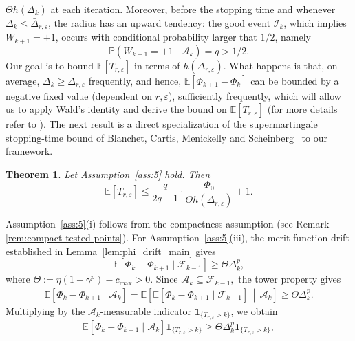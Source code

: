 \documentclass[11pt,a4paper]{article}
\newtheorem{theorem}{Theorem}[section]
\newcommand{\me}{\mathbb{E}}
\newcommand{\D}{\Delta}
\newcommand{\Dexp}{p}
\newcommand{\goldelta}{r}
\begin{document}
\(\Theta h(\Delta_k)\) at each iteration. Moreover, before the stopping time
and whenever \(\Delta_k\le \bar\Delta_{\goldelta,\varepsilon}\), the radius
has an upward tendency: the good event \(\mathcal I_k\), which implies
\(W_{k+1}=+1\), occurs with conditional probability larger that  \(1/2\), namely
\[\mathbb P(W_{k+1}=+1\mid\mathcal A_k)
   = q >1/2.
\]
Our goal is to bound \(\mathbb E[T_{\goldelta,\varepsilon}]\) in terms of
\(h(\bar\Delta_{\goldelta,\varepsilon})\). What happens is that, on average, $\D_k \geq \bar \D_{\goldelta,\varepsilon}$ frequently, and hence, $\me[\Phi_{k+1} - \Phi_k]$ can be bounded by a negative fixed value (dependent on $\goldelta, \varepsilon$), sufficiently frequently, which will allow us
to apply Wald’s identity and derive the bound on $\me[T_{\goldelta,\varepsilon}]$ (for more details refer to \cite[Theorem 2]{MR4151319}). 
The next result is a direct specialization of the supermartingale stopping-time bound of Blanchet, Cartis, Menickelly and Scheinberg~\cite[Theorem~2]{MR4151319} to our framework.
\begin{theorem}\label{t:expected complexity}
    Let Assumption~\ref{ass:5} hold. Then
    \[
        \mathbb E[T_{\goldelta,\varepsilon}]
        \le
        \frac{q}{2q-1}
        \cdot
        \frac{\Phi_0}{\Theta h(\bar\Delta_{\goldelta,\varepsilon})}
        +1 .
    \]
\end{theorem}
Assumption~\ref{ass:5}(i) follows from the compactness assumption (see Remark \ref{rem:compact-tested-points}). For Assumption~\ref{ass:5}(iii), the merit-function drift established in Lemma~\ref{lem:phi_drift_main} gives
\[
    \mathbb E[
        \Phi_k-\Phi_{k+1}
        \mid
        \mathcal F_{k-1}
    ]
    \ge
    \Theta\Delta_k^{\Dexp},
\]
where
    $\Theta:=\eta(1-\gamma^{\Dexp})-c_{\max}>0.$
Since
\(
    \mathcal A_k\subseteq\mathcal F_{k-1},
\)
the tower property gives
\[
\begin{aligned}
    \mathbb E[
        \Phi_k-\Phi_{k+1}
        \mid
        \mathcal A_k
    ]
    =
    \mathbb E\!\left[
        \mathbb E[
            \Phi_k-\Phi_{k+1}
            \mid
            \mathcal F_{k-1}
        ]
        \,\middle|\,
        \mathcal A_k
    \right]                                                   
    \ge
    \Theta\Delta_k^{\Dexp}.
\end{aligned}
\]
Multiplying by the \(\mathcal A_k\)-measurable indicator
\(\mathbf 1_{\{T_{\goldelta,\varepsilon}>k\}}\), we obtain
\[
    \mathbb E[
        \Phi_k-\Phi_{k+1}
        \mid
        \mathcal A_k
    ]
    \mathbf 1_{\{T_{\goldelta,\varepsilon}>k\}}
    \ge
    \Theta\Delta_k^{\Dexp}
    \mathbf 1_{\{T_{\goldelta,\varepsilon}>k\}},
\]
\end{document}
